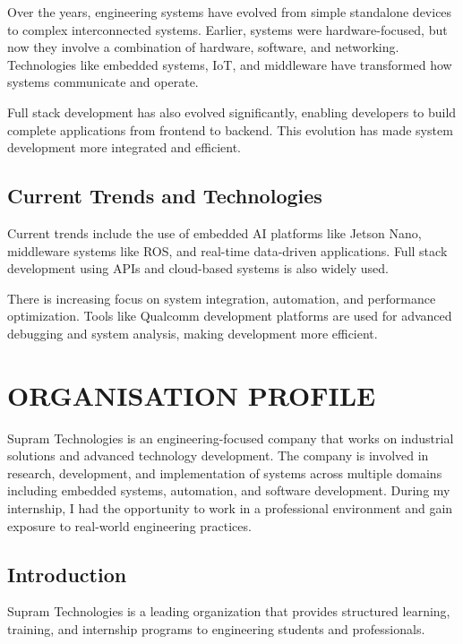 \documentclass[12pt,a4paper]{report}
\begin{document}
Over the years, engineering systems have evolved from simple standalone devices to complex interconnected systems. Earlier, systems were hardware-focused, but now they involve a combination of hardware, software, and networking. Technologies like embedded systems, IoT, and middleware have transformed how systems communicate and operate.


Full stack development has also evolved significantly, enabling developers to build complete applications from frontend to backend. This evolution has made system development more integrated and efficient.


\section{Current Trends and Technologies}

Current trends include the use of embedded AI platforms like Jetson Nano, middleware systems like ROS, and real-time data-driven applications. Full stack development using APIs and cloud-based systems is also widely used.


There is increasing focus on system integration, automation, and performance optimization. Tools like Qualcomm development platforms are used for advanced debugging and system analysis, making development more efficient.




\chapter{ORGANISATION PROFILE}


Supram Technologies is an engineering-focused company that works on industrial solutions and advanced technology development. The company is involved in research, development, and implementation of systems across multiple domains including embedded systems, automation, and software development. During my internship, I had the opportunity to work in a professional environment and gain exposure to real-world engineering practices.


\section{Introduction}

Supram Technologies is a leading organization that provides structured learning, training, and internship programs to engineering students and professionals.
\end{document}
